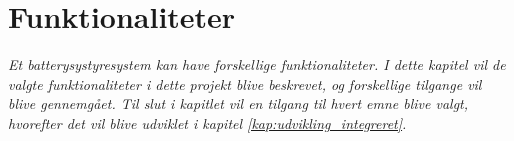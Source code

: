 \chapter{Funktionaliteter}\label{kap:funktionaliteter}

\emph{Et batterysystyresystem kan have forskellige funktionaliteter. I dette kapitel vil de valgte funktionaliteter i dette projekt blive beskrevet, og forskellige tilgange vil blive gennemgået. Til slut i kapitlet vil en tilgang til hvert emne blive valgt, hvorefter det vil blive udviklet i kapitel \ref{kap:udvikling_integreret}.}


